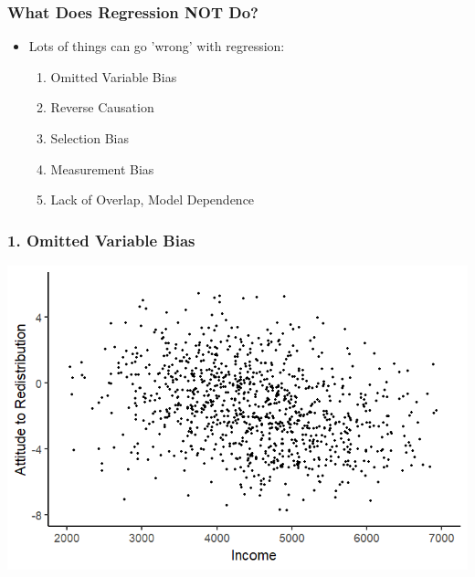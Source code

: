 \documentclass[xcolor=x11names,compress]{beamer}\usepackage[]{graphicx}\usepackage[]{color}
\makeatletter
\def\maxwidth{ %
  \ifdim\Gin@nat@width>\linewidth
    \linewidth
  \else
    \Gin@nat@width
  \fi
}
\newenvironment{knitrout}{}{} %
\renewcommand{\(}{\begin{columns}}
\renewcommand{\)}{\end{columns}}
\newcommand{\<}[1]{\begin{column}{#1}}
\renewcommand{\>}{\end{column}}
\makeatother
\begin{document}








\begin{frame}
\frametitle{What Does Regression NOT Do?}
\begin{itemize}
\item Lots of things can go 'wrong' with regression:
\begin{enumerate}
\item Omitted Variable Bias
\item Reverse Causation
\item Selection Bias
\item Measurement Bias
\item Lack of Overlap, Model Dependence
\end{enumerate}
\end{itemize}
\end{frame}

\begin{frame}
\frametitle{1. Omitted Variable Bias}
\begin{knitrout}
\color{fgcolor}
\includegraphics[width=\maxwidth]{figure/confound3b-1} 

\end{knitrout}
\end{frame}
\end{document}
